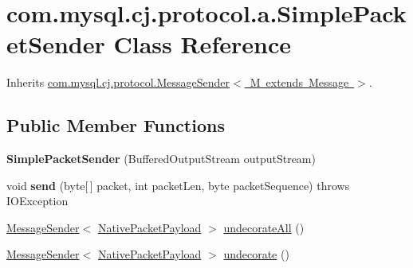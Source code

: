 \hypertarget{classcom_1_1mysql_1_1cj_1_1protocol_1_1a_1_1_simple_packet_sender}{}\section{com.\+mysql.\+cj.\+protocol.\+a.\+Simple\+Packet\+Sender Class Reference}
\label{classcom_1_1mysql_1_1cj_1_1protocol_1_1a_1_1_simple_packet_sender}


Inherits \mbox{\hyperlink{interfacecom_1_1mysql_1_1cj_1_1protocol_1_1_message_sender}{com.\+mysql.\+cj.\+protocol.\+Message\+Sender$<$ M extends Message $>$}}.

\subsection*{Public Member Functions}
\begin{DoxyCompactItemize}
\item 
\mbox{\label{classcom_1_1mysql_1_1cj_1_1protocol_1_1a_1_1_simple_packet_sender_a0cfdd0d43649fedca7f4ba2fccb983ce}} 
{\bfseries Simple\+Packet\+Sender} (Buffered\+Output\+Stream output\+Stream)
\item 
\mbox{\label{classcom_1_1mysql_1_1cj_1_1protocol_1_1a_1_1_simple_packet_sender_a88b66f65476a850c58ffa47bc862661e}} 
void {\bfseries send} (byte\mbox{[}$\,$\mbox{]} packet, int packet\+Len, byte packet\+Sequence)  throws I\+O\+Exception 
\item 
\mbox{\hyperlink{interfacecom_1_1mysql_1_1cj_1_1protocol_1_1_message_sender}{Message\+Sender}}$<$ \mbox{\hyperlink{classcom_1_1mysql_1_1cj_1_1protocol_1_1a_1_1_native_packet_payload}{Native\+Packet\+Payload}} $>$ \mbox{\hyperlink{classcom_1_1mysql_1_1cj_1_1protocol_1_1a_1_1_simple_packet_sender_a2fa36445cf29dff6e32000dc6c95c831}{undecorate\+All}} ()
\item 
\mbox{\hyperlink{interfacecom_1_1mysql_1_1cj_1_1protocol_1_1_message_sender}{Message\+Sender}}$<$ \mbox{\hyperlink{classcom_1_1mysql_1_1cj_1_1protocol_1_1a_1_1_native_packet_payload}{Native\+Packet\+Payload}} $>$ \mbox{\hyperlink{classcom_1_1mysql_1_1cj_1_1protocol_1_1a_1_1_simple_packet_sender_a7258a5245f263cf4635daba8be258e36}{undecorate}} ()
\end{DoxyCompactItemize}


